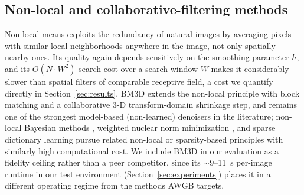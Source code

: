 \documentclass[final,3p,times,twocolumn,nopreprintline]{elsarticle}
\begin{document}
\subsection{Non-local and collaborative-filtering methods}
Non-local means \cite{buades2005non} exploits the redundancy of natural images by averaging pixels with similar local neighborhoods anywhere in the image, not only spatially nearby ones. Its quality again depends sensitively on the smoothing parameter $h$, and its $O(N \cdot W^2)$ search cost over a search window $W$ makes it considerably slower than spatial filters of comparable receptive field, a cost we quantify directly in Section~\ref{sec:results}. BM3D \cite{dabov2007image} extends the non-local principle with block matching and a collaborative 3-D transform-domain shrinkage step, and remains one of the strongest model-based (non-learned) denoisers in the literature; non-local Bayesian methods \cite{lebrun2012nonlocal}, weighted nuclear norm minimization \cite{gu2014weighted}, and sparse dictionary learning \cite{elad2006image} pursue related non-local or sparsity-based principles with similarly high computational cost. We include BM3D in our evaluation as a fidelity ceiling rather than a peer competitor, since its $\sim$9--11~s per-image runtime in our test environment (Section~\ref{sec:experiments}) places it in a different operating regime from the methods AWGB targets.
\end{document}
